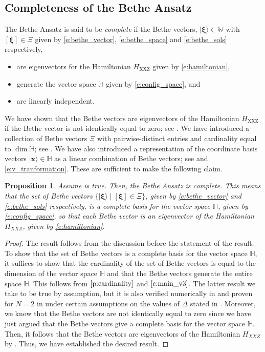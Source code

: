 \documentclass[a4paper,11pt]{article}
\newtheorem{proposition}[theorem]{Proposition}
\theoremstyle{definition}
\begin{document}
\subsection{Completeness of the Bethe Ansatz}\label{s:complete}

The Bethe Ansatz is said to be \emph{complete} if the Bethe vectors, $| \boldsymbol{\xi} \rangle \in \mathbb{W}$ with $[\boldsymbol{\xi}] \in \Xi$ given by \eqref{e:bethe_vector}, \eqref{e:bethe_space} and \eqref{e:bethe_sols} respectively,  
\begin{itemize}
    \item [(i)] are eigenvectors for the Hamiltonian $H_{\mathrm{XXZ}}$ given by \eqref{e:hamiltonian},
    \item [(ii)] generate the vector space $\mathbb{H}$ given by \eqref{e:config_space}, and
    \item [(iii)] are linearly independent.
\end{itemize}
We have shown that the Bethe vectors are eigenvectors of the Hamiltonian $H_{\mathrm{XXZ}}$ if the Bethe vector is not identically equal to zero; see . We have introduced a collection of Bethe vectors $\Xi$ with pairwise-distinct entries and cardinality equal to $\dim \mathbb{H}$; see . We have also introduced a representation of the coordinate basis vectors $| \mathbf{x} \rangle \in \mathbb{H}$ as a linear combination of Bethe vectors; see  and \eqref{e:v_tranformation}. These are sufficient to make the following claim.

\begin{proposition}
    Assume  is true. Then, the Bethe Ansatz is complete. This means that the set of Bethe vectors $\{ |\boldsymbol{\xi}\rangle \mid [\boldsymbol{\xi}] \in \Xi \}$, given by \eqref{e:bethe_vector} and \eqref{e:bethe_sols} respectively, is a complete basis for the vector space $\mathbb{H}$, given by \eqref{e:config_space}, so that each Bethe vector is an eigenvector of the Hamiltonian $H_{XXZ}$, given by \eqref{e:hamiltonian}.
\end{proposition}

\begin{proof}
The result follows from the discussion before the statement of the result. To show that the set of Bethe vectors is a complete basis for the vector space $\mathbb{H}$, it suffices to show that the cardinality of the set of Bethe vectors is equal to the dimension of the vector space $\mathbb{H}$ and that the Bethe vectors generate the entire space $\mathbb{H}$. This follows from $\Cref{p:cardinality}$ and $\Cref{c:main_v3}$. The latter result we take to be true by assumption, but it is also verified numerically in  and proven for $N=2$ in  under certain assumptions on the values of $\Delta$ stated in . Moreover, we know that the Bethe vectors are not identically equal to zero since we have just argued that the Bethe vectors give a complete basis for the vector space $\mathbb{H}$. Then, it follows that the Bethe vectors are eigenvectors of the Hamiltonian $H_{XXZ}$ by . Thus, we have established the desired result. 
\end{proof}
\end{document}
